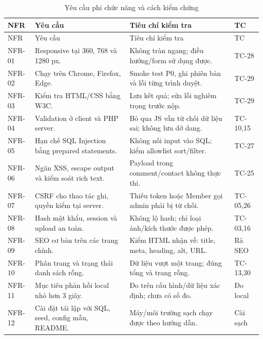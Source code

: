 {\small
\begin{longtable}{@{}P{1.8cm}P{5.1cm}P{6cm}P{1.6cm}@{}}
\caption{Yêu cầu phi chức năng và cách kiểm chứng}\label{tab:nfr}\\
\toprule NFR & Yêu cầu & Tiêu chí kiểm tra & TC\\\midrule\endfirsthead
\toprule NFR & Yêu cầu & Tiêu chí kiểm tra & TC\\\midrule\endhead
NFR-01 & Responsive tại 360, 768 và 1280 px. & Không tràn ngang; điều hướng/form sử dụng được. & TC-28\\
NFR-02 & Chạy trên Chrome, Firefox, Edge. & Smoke test P0, ghi phiên bản và lỗi từng trình duyệt. & TC-29\\
NFR-03 & Kiểm tra HTML/CSS bằng W3C. & Lưu kết quả; sửa lỗi nghiêm trọng trước nộp. & TC-29\\
NFR-04 & Validation ở client và PHP server. & Bỏ qua JS vẫn từ chối dữ liệu sai; không lưu dở dang. & TC-10,15\\
NFR-05 & Hạn chế SQL Injection bằng prepared statements. & Không nối input vào SQL; kiểm allowlist sort/filter. & TC-27\\
NFR-06 & Ngăn XSS, escape output và kiểm soát rich text. & Payload trong comment/contact không thực thi. & TC-25\\
NFR-07 & CSRF cho thao tác ghi, quyền kiểm tại server. & Thiếu token hoặc Member gọi admin phải bị từ chối. & TC-05,26\\
NFR-08 & Hash mật khẩu, session và upload an toàn. & Không lộ hash; chỉ loại ảnh/kích thước được phép. & TC-03,16\\
NFR-09 & SEO cơ bản trên các trang chính. & Kiểm HTML nhận về: title, meta, heading, alt, URL. & Rà SEO\\
NFR-10 & Phân trang và trạng thái danh sách rỗng. & Dữ liệu vượt một trang; đúng tổng và trang rỗng. & TC-13,30\\
NFR-11 & Mục tiêu phản hồi local nhỏ hơn 3 giây. & Đo trên cấu hình/dữ liệu xác định; chưa có số đo. & Đo local\\
NFR-12 & Cài đặt tái lập với SQL, seed, config mẫu, README. & Máy/môi trường sạch chạy được theo hướng dẫn. & Cài sạch\\
\bottomrule\end{longtable}
}
